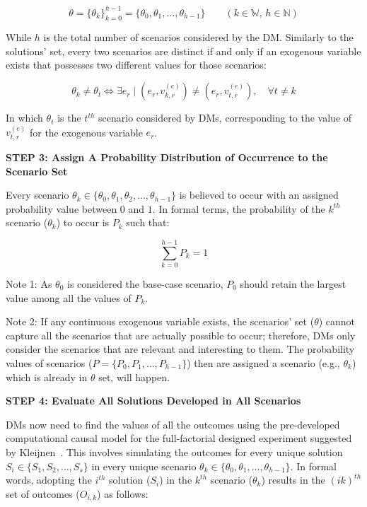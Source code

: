 \documentclass{sfuthesis}
\begin{document}
\begin{equation}
\theta
=
\{\theta_k\}_{k=0}^{h-1}
=
\{\theta_0,\theta_1,\ldots,\theta_{h-1}\}
\qquad (k\in\mathbb{W},\, h\in\mathbb{N})
\end{equation}

While $h$ is the total number of scenarios considered by the DM. Similarly to the solutions' set, every two scenarios are distinct if and only if an exogenous variable exists that possesses two different values for those scenarios:

\begin{equation}
\theta_k \neq \theta_t
\iff
\exists e_r
\;\Big|\;
(e_r,v_{k,r}^{(e)})
\neq
(e_r,v_{t,r}^{(e)}),
\quad \forall t \neq k
\end{equation}

In which $\theta_t$ is the $t^{th}$ scenario considered by DMs, corresponding to the value of $v_{t,r}^{(e)}$ for the exogenous variable $e_r$.\par

\textbf{STEP 3: Assign A Probability Distribution of Occurrence to the Scenario Set}

Every scenario $\theta_k\in\{\theta_0,\theta_1,\theta_2,\ldots,\theta_{h-1}\}$
is believed to occur with an assigned probability value between $0$ and $1$.
In formal terms, the probability of the $k^{th}$ scenario ($\theta_k$) to occur
is $P_k$ such that:

\begin{equation}
\sum_{k=0}^{h-1} P_k = 1
\end{equation}

Note 1: As $\theta_0$ is considered the base-case scenario, $P_0$ should retain the largest value among all the values of $P_k$.\par
Note 2: If any continuous exogenous variable exists, the scenarios’ set ($\theta$) cannot capture all the scenarios that are actually possible to occur; therefore, DMs only consider the scenarios that are relevant and interesting to them. The probability values of scenarios ($P=\{P_0,P_1,\ldots,P_{h-1}\}$) then are assigned a scenario (e.g., $\theta_k$) which is already in $\theta$ set, will happen.

\textbf{STEP 4: Evaluate All Solutions Developed in All Scenarios}

DMs now need to find the values of all the outcomes using the pre-developed
computational causal model for the full-factorial designed experiment suggested by Kleijnen~\cite{kleijnen1995sensitivity}. This involves simulating the outcomes for every unique solution $S_i\in\{S_1,S_2,\ldots,S_s\}$ in every unique scenario $\theta_k\in\{\theta_0,\theta_1,\ldots,\theta_{h-1}\}$. In formal words, adopting the $i^{th}$ solution ($S_i$) in the $k^{th}$ scenario ($\theta_k$) results in the $({ik})^{th}$ set of outcomes ($O_{i,k}$) as follows:
\end{document}
